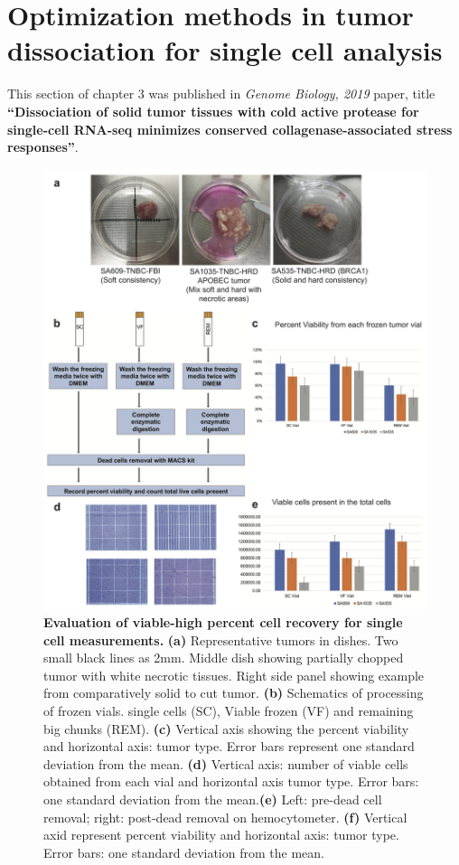 \section{Optimization methods in tumor dissociation for single cell analysis}

This section of chapter 3 was published in \textit{Genome Biology, 2019} paper, title  \textbf{``Dissociation of solid tumor tissues with cold active protease for single-cell RNA-seq minimizes conserved collagenase-associated stress responses''}.

\begin{figure}
	\centering
	\includegraphics[width=\textwidth]{Figures/chap3/cellviability2.png}
	\caption[Evaluation of viable-high percent cell recovery for single cell measurements]
	{\small
	    \textbf{Evaluation of viable-high percent cell recovery for single cell measurements.}
	    \textbf{(a)} Representative tumors in dishes. Two small black lines as 2mm. Middle dish showing partially chopped tumor with white necrotic tissues. Right side panel showing example from comparatively solid to cut tumor.
	    \textbf{(b)} Schematics of processing of frozen vials. single cells (SC), Viable frozen (VF) and remaining big chunks (REM).
	    \textbf{(c)} Vertical axis showing the percent viability and horizontal axis: tumor type. Error bars represent one standard deviation from the mean. \textbf{(d)} Vertical axis: number of viable cells obtained from each vial and horizontal axis tumor type. Error bars: one standard deviation from the mean.\textbf{(e)} Left: pre-dead cell removal; right: post-dead removal on hemocytometer. \textbf{(f)} Vertical axid represent percent viability and   horizontal axis: tumor type. Error bars: one standard deviation from the mean.  
	}
	\label{fig:cellviability}
\end{figure}
